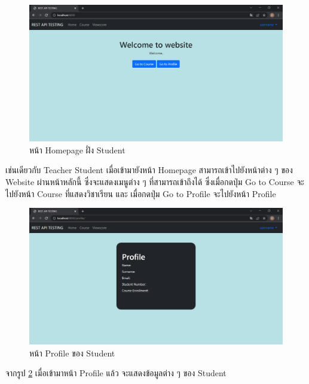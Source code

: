 \begin{figure}[H]
    \captionsetup{justification=centering}
    \centering
    \includegraphics[width=5in]{figures/chapter4/homepage.PNG}
    \caption{หน้า Homepage ฝั่ง Student}
    \label{figure:homepage}
\end{figure}
เช่นเดียวกับ Teacher Student เมื่อเข้ามายังหน้า Homepage สามารถเข้าไปยังหน้าต่าง ๆ ของ Website ผ่านหน้าหลักนี้ ซึ่งจะแสดงเมนูต่าง ๆ ที่สามารถเข้าถึงได้ ซึ่งเมื่อกดปุ่ม Go to Course จะไปยังหน้า Course ที่แสดงวิชาเรียน และ เมื่อกดปุ่ม Go to Profile จะไปยังหน้า Profile
\newpage

\begin{figure}[H]
    \captionsetup{justification=centering}
    \centering
    \includegraphics[width=5in]{figures/chapter4/profile.PNG}
    \caption{หน้า Profile ของ Student}
    \label{figure:profile}
\end{figure}
จากรูป \ref{figure:profile} เมื่อเข้ามาหน้า Profile แล้ว จะแสดงข้อมูลต่าง ๆ ของ Student

